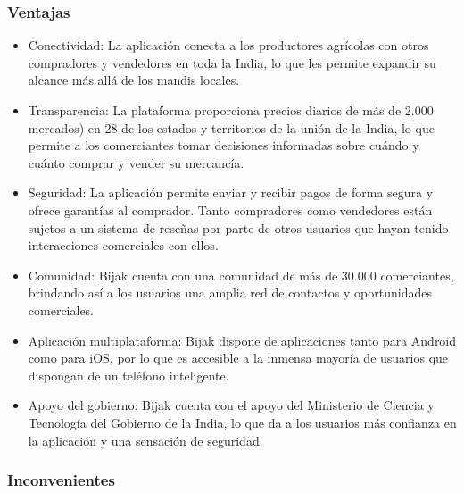 
\subsubsection{Ventajas}

\begin{itemize}

	\item Conectividad: La aplicación conecta a los productores agrícolas con otros compradores y vendedores en toda la India, lo que les permite expandir su alcance más allá de los mandis locales.

	\item Transparencia: La plataforma proporciona precios diarios de más de 2.000 mercados) en 28 de los estados y territorios de la unión de la India, lo que permite a los comerciantes tomar decisiones informadas sobre cuándo y cuánto comprar y vender su mercancía.

	\item Seguridad: La aplicación permite enviar y recibir pagos de forma segura y ofrece garantías al comprador. Tanto compradores como vendedores están sujetos a un sistema de reseñas por parte de otros usuarios que hayan tenido interacciones comerciales con ellos.

	\item Comunidad: Bijak cuenta con una comunidad de más de 30.000 comerciantes, brindando así a los usuarios una amplia red de contactos y oportunidades comerciales.

	\item Aplicación multiplataforma: Bijak dispone de aplicaciones tanto para Android como para iOS, por lo que es accesible a la inmensa mayoría de usuarios que dispongan de un teléfono inteligente.

	\item Apoyo del gobierno: Bijak cuenta con el apoyo del Ministerio de Ciencia y Tecnología del Gobierno de la India, lo que da a los usuarios más confianza en la aplicación y una sensación de seguridad.

\end{itemize}

\subsubsection{Inconvenientes}

